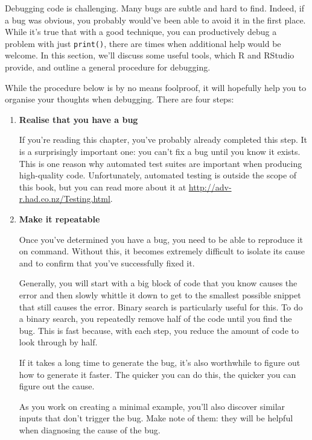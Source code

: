 Debugging code is challenging. Many bugs are subtle and hard to find.
Indeed, if a bug was obvious, you probably would've been able to avoid
it in the first place. While it's true that with a good technique, you
can productively debug a problem with just \texttt{print()}, there are
times when additional help would be welcome. In this section, we'll
discuss some useful tools, which R and RStudio provide, and outline a
general procedure for debugging.  

While the procedure below is by no means foolproof, it will hopefully
help you to organise your thoughts when debugging. There are four steps:

\begin{enumerate}
\def\labelenumi{\arabic{enumi}.}
\item
  \textbf{Realise that you have a bug}

  If you're reading this chapter, you've probably already completed this
  step. It is a surprisingly important one: you can't fix a bug until
  you know it exists. This is one reason why automated test suites are
  important when producing high-quality code. Unfortunately, automated
  testing is outside the scope of this book, but you can read more about
  it at \url{http://adv-r.had.co.nz/Testing.html}.
\item
  \textbf{Make it repeatable}

  Once you've determined you have a bug, you need to be able to
  reproduce it on command. Without this, it becomes extremely difficult
  to isolate its cause and to confirm that you've successfully fixed it.

  Generally, you will start with a big block of code that you know
  causes the error and then slowly whittle it down to get to the
  smallest possible snippet that still causes the error. Binary search
  is particularly useful for this. To do a binary search, you repeatedly
  remove half of the code until you find the bug. This is fast because,
  with each step, you reduce the amount of code to look through by half.

  If it takes a long time to generate the bug, it's also worthwhile to
  figure out how to generate it faster. The quicker you can do this, the
  quicker you can figure out the cause.

  As you work on creating a minimal example, you'll also discover
  similar inputs that don't trigger the bug. Make note of them: they
  will be helpful when diagnosing the cause of the bug.


\end{enumerate}
